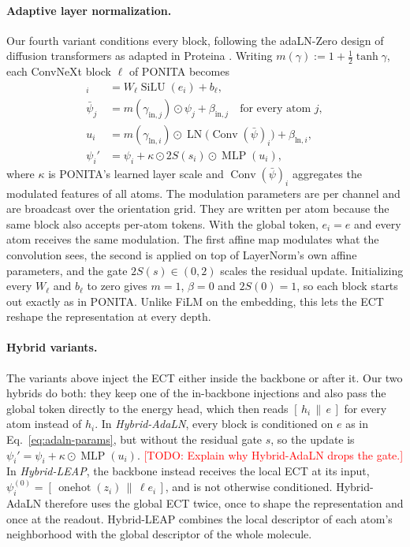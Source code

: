 \documentclass{article}
\newcommand{\todo}[1]{\textcolor{red}{[TODO: #1]}}
\newcommand{\onehot}{\operatorname{onehot}}
\newcommand{\SiLU}{\operatorname{SiLU}}
\newcommand{\LN}{\operatorname{LN}}
\newcommand{\Conv}{\operatorname{Conv}}
\newcommand{\MLP}{\operatorname{MLP}}
\begin{document}
\paragraph{Adaptive layer normalization.}
Our fourth variant conditions every block, following the adaLN-Zero design of diffusion transformers \citep{peebles2023dit} as adapted in Proteina \citep{geffner2025proteina}. Writing $m(\gamma) := 1 + \frac12\tanh\gamma$, each ConvNeXt block $\ell$ of PONITA becomes
\begin{align}
  [\gamma_{\mathrm{in}},\beta_{\mathrm{in}},\gamma_{\mathrm{ln}},\beta_{\mathrm{ln}},s]_i &= W_\ell\SiLU(e_i) + b_\ell, \label{eq:adaln-params}\\
  \bar\psi_j &= m(\gamma_{\mathrm{in},j})\odot\psi_j + \beta_{\mathrm{in},j} \quad\text{for every atom } j, \label{eq:adaln-in}\\
  u_i &= m(\gamma_{\mathrm{ln},i})\odot \LN\big(\Conv(\bar\psi)_i\big) + \beta_{\mathrm{ln},i}, \label{eq:adaln-ln}\\
  \psi_i' &= \psi_i + \kappa\odot 2S(s_i)\odot\MLP(u_i), \label{eq:adaln-out}
\end{align}
where $\kappa$ is PONITA's learned layer scale and $\Conv(\bar\psi)_i$ aggregates the modulated features of all atoms. The modulation parameters are per channel and are broadcast over the orientation grid. They are written per atom because the same block also accepts per-atom tokens. With the global token, $e_i = e$ and every atom receives the same modulation. The first affine map modulates what the convolution sees, the second is applied on top of LayerNorm's own affine parameters, and the gate $2S(s)\in(0,2)$ scales the residual update. Initializing every $W_\ell$ and $b_\ell$ to zero gives $m=1$, $\beta=0$ and $2S(0)=1$, so each block starts out exactly as in PONITA. Unlike FiLM on the embedding, this lets the ECT reshape the representation at every depth.

\paragraph{Hybrid variants.}
The variants above inject the ECT either inside the backbone or after it. Our two hybrids do both: they keep one of the in-backbone injections and also pass the global token directly to the energy head, which then reads $[\,h_i \,\|\, e\,]$ for every atom instead of $h_i$. In \emph{Hybrid-AdaLN}, every block is conditioned on $e$ as in Eq.~\eqref{eq:adaln-params}, but without the residual gate $s$, so the update is $\psi_i' = \psi_i + \kappa\odot\MLP(u_i)$. \todo{Explain why Hybrid-AdaLN drops the gate.} In \emph{Hybrid-LEAP}, the backbone instead receives the local ECT at its input, $\psi_i^{(0)} = [\,\onehot(z_i)\,\|\,\ell e_i\,]$, and is not otherwise conditioned. Hybrid-AdaLN therefore uses the global ECT twice, once to shape the representation and once at the readout. Hybrid-LEAP combines the local descriptor of each atom's neighborhood with the global descriptor of the whole molecule.
\end{document}
